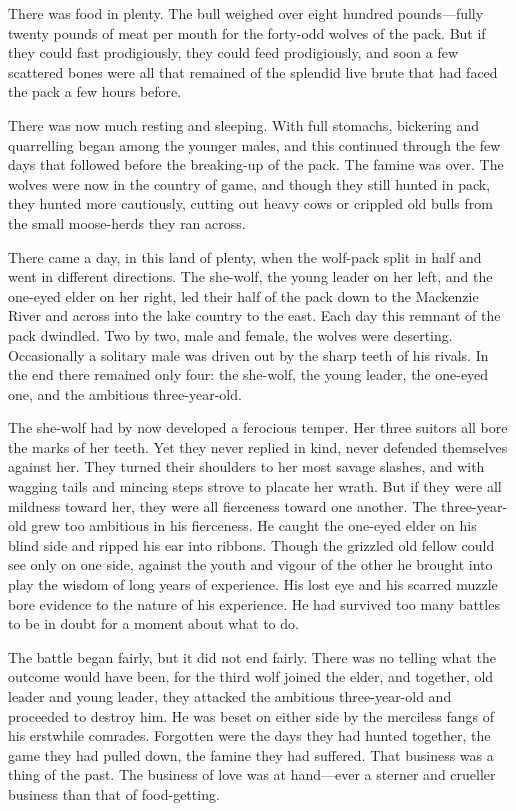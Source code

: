 \documentclass[10pt]{book}
\begin{document}
There was food in plenty. The bull weighed over eight hundred
pounds—fully twenty pounds of meat per mouth for the forty-odd wolves
of the pack. But if they could fast prodigiously, they could feed
prodigiously, and soon a few scattered bones were all that remained of
the splendid live brute that had faced the pack a few hours before.

There was now much resting and sleeping. With full stomachs, bickering
and quarrelling began among the younger males, and this continued
through the few days that followed before the breaking-up of the pack.
The famine was over. The wolves were now in the country of game, and
though they still hunted in pack, they hunted more cautiously, cutting
out heavy cows or crippled old bulls from the small moose-herds they
ran across.

There came a day, in this land of plenty, when the wolf-pack split in
half and went in different directions. The she-wolf, the young leader
on her left, and the one-eyed elder on her right, led their half of the
pack down to the Mackenzie River and across into the lake country to
the east. Each day this remnant of the pack dwindled. Two by two, male
and female, the wolves were deserting. Occasionally a solitary male was
driven out by the sharp teeth of his rivals. In the end there remained
only four: the she-wolf, the young leader, the one-eyed one, and the
ambitious three-year-old.

The she-wolf had by now developed a ferocious temper. Her three suitors
all bore the marks of her teeth. Yet they never replied in kind, never
defended themselves against her. They turned their shoulders to her
most savage slashes, and with wagging tails and mincing steps strove to
placate her wrath. But if they were all mildness toward her, they were
all fierceness toward one another. The three-year-old grew too
ambitious in his fierceness. He caught the one-eyed elder on his blind
side and ripped his ear into ribbons. Though the grizzled old fellow
could see only on one side, against the youth and vigour of the other
he brought into play the wisdom of long years of experience. His lost
eye and his scarred muzzle bore evidence to the nature of his
experience. He had survived too many battles to be in doubt for a
moment about what to do.

The battle began fairly, but it did not end fairly. There was no
telling what the outcome would have been, for the third wolf joined the
elder, and together, old leader and young leader, they attacked the
ambitious three-year-old and proceeded to destroy him. He was beset on
either side by the merciless fangs of his erstwhile comrades. Forgotten
were the days they had hunted together, the game they had pulled down,
the famine they had suffered. That business was a thing of the past.
The business of love was at hand—ever a sterner and crueller business
than that of food-getting.
\end{document}
